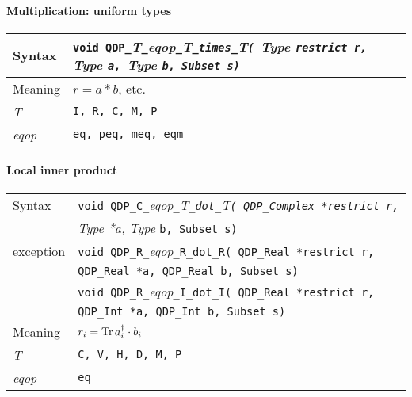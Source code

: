\documentclass{article}
\newcommand{\Tr}{\mathop{\rm Tr}}
\newcommand{\tReal}{QDP\ttdash Real }
\newcommand{\tComplex}{QDP\ttdash Complex }
\newcommand{\tInt}{QDP\ttdash Int }
\newcommand{\namespace}{QDP}
\newcommand{\allEqOps}{{\tt eq, peq, meq, eqm}}
\newcommand{\allComplexTypes}{{\tt C, V, H, D, M, P}}
\newcommand{\ttdash}{{\tt \_}}
\newcommand{\itt}{\it T}
\newcommand{\extraarg}{, Subset s}
\begin{document}
\paragraph{Multiplication: uniform types}

\begin{flushleft}
  \begin{tabular}{|l|l|}
  \hline
  Syntax      & {\tt void \namespace}\ttdash\itt\ttdash{\it eqop}\ttdash\itt\ttdash{\tt times}\ttdash\itt{\tt ( }{\it Type }{\tt *restrict r, }{\it Type }{\tt *a, }{\it Type }{\tt *b\extraarg)} \\
  \hline
  Meaning     & $r = a * b$, etc. \\
  \hline
  \itt        & {\tt I, R, C, M, P} \\
  \hline
  {\it eqop}  & \allEqOps \\
  \hline
  \end{tabular}
\end{flushleft}

\paragraph{Local inner product}

\begin{flushleft}
  \begin{tabular}{|l|l|}
  \hline
  Syntax      & {\tt void \namespace}\ttdash{\tt C}\ttdash{\it eqop}\ttdash\itt\ttdash{\tt dot}\ttdash\itt{\tt ( \tComplex *restrict r, }\\
              & {\it Type *a, }{\it Type }{\tt *b\extraarg)} \\
  exception   & {\tt void \namespace}\ttdash{\tt R}\ttdash{\it eqop}\ttdash{\tt R}\ttdash{\tt dot}\ttdash{\tt R}{\tt ( \tReal *restrict r, }\\
              & {\tt \tReal *a, }{\tt \tReal }{\tt *b\extraarg)} \\
              & {\tt void \namespace}\ttdash{\tt R}\ttdash{\it eqop}\ttdash{\tt I}\ttdash{\tt dot}\ttdash{\tt I}{\tt ( \tReal *restrict r, }\\
              & {\tt \tInt *a, }{\tt \tInt }{\tt *b\extraarg)} \\
  \hline
  Meaning     & $r_i = \Tr a^\dagger_i \cdot b_i$ \\
  \hline
  \itt        & \allComplexTypes \\
  \hline
  {\it eqop}  & {\tt eq} \\
  \hline
  \end{tabular}
\end{flushleft}
\end{document}
